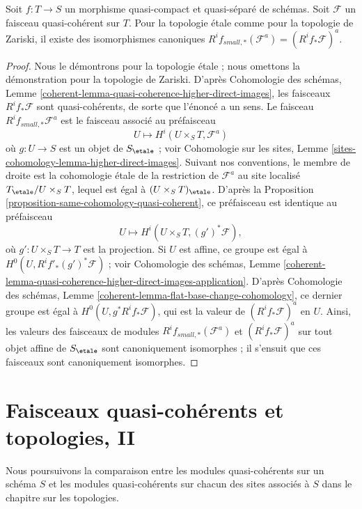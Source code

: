 \begin{lemma}
\label{lemma-higher-direct-images-small-etale}
Soit $f : T \to S$ un morphisme quasi-compact et quasi-séparé de schémas.
Soit $\mathcal{F}$ un faisceau quasi-cohérent sur $T$. Pour la topologie
\'etale comme pour la topologie de Zariski, il existe des isomorphismes canoniques
$R^if_{small, *}(\mathcal{F}^a) = (R^if_*\mathcal{F})^a$.
\end{lemma}

\begin{proof}
Nous le démontrons pour la topologie \'etale ; nous omettons la démonstration
pour la topologie de Zariski. D'après Cohomologie des schémas, Lemme
\ref{coherent-lemma-quasi-coherence-higher-direct-images},
les faisceaux $R^if_*\mathcal{F}$ sont quasi-cohérents, de sorte que l'énoncé
a un sens. Le faisceau $R^if_{small, *}\mathcal{F}^a$ est le faisceau associé
au préfaisceau
$$
U \longmapsto H^i(U \times_S T, \mathcal{F}^a)
$$
où $g : U \to S$ est un objet de $S_\etale$ ; voir Cohomologie sur les sites,
Lemme \ref{sites-cohomology-lemma-higher-direct-images}.
Suivant nos conventions, le membre de droite est la cohomologie \'etale
de la restriction de $\mathcal{F}^a$ au site localisé
$T_\etale/U \times_S T$, lequel est égal à
$(U \times_S T)_\etale$. D'après la
Proposition \ref{proposition-same-cohomology-quasi-coherent},
ce préfaisceau est identique au préfaisceau
$$
U \longmapsto
H^i(U \times_S T, (g')^*\mathcal{F}),
$$
où $g' : U \times_S T \to T$ est la projection. Si $U$ est affine,
ce groupe est égal à $H^0(U, R^if'_*(g')^*\mathcal{F})$ ; voir
Cohomologie des schémas, Lemme
\ref{coherent-lemma-quasi-coherence-higher-direct-images-application}.
D'après Cohomologie des schémas, Lemme
\ref{coherent-lemma-flat-base-change-cohomology},
ce dernier groupe est égal à $H^0(U, g^*R^if_*\mathcal{F})$, qui est la valeur
de $(R^if_*\mathcal{F})^a$ en $U$.
Ainsi, les valeurs des faisceaux de modules
$R^if_{small, *}(\mathcal{F}^a)$ et $(R^if_*\mathcal{F})^a$
sur tout objet affine de $S_\etale$ sont canoniquement isomorphes ;
il s'ensuit que ces faisceaux sont canoniquement isomorphes.
\end{proof}




\section{Faisceaux quasi-cohérents et topologies, II}
\label{section-quasi-coherent-sheaves-bis}

\noindent
Nous poursuivons la comparaison entre les modules quasi-cohérents sur un
schéma $S$ et les modules quasi-cohérents sur chacun des sites associés à
$S$ dans le chapitre sur les topologies.


